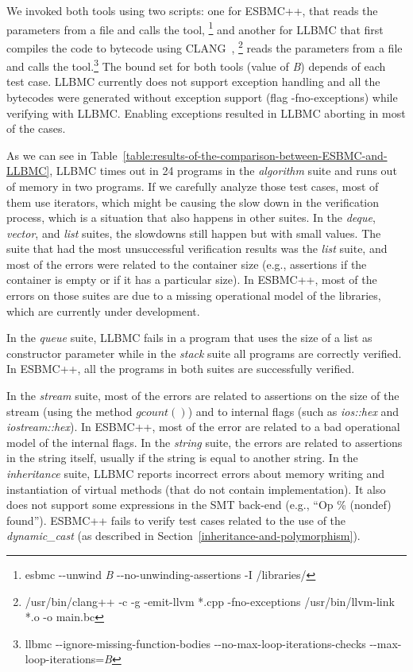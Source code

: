 \documentclass[conference]{IEEEtran}
\begin{document}
We invoked both tools using two scripts: one for ESBMC++, that reads
the parameters from a file and calls the tool,%
\footnote[1]{esbmc -\/-unwind \textit{B}  -\/-no-unwinding-assertions -I /libraries/}
and another for LLBMC that first compiles the code to bytecode using CLANG~\cite{CLANG},%
\footnote[2]{/usr/bin/clang++ -c -g -emit-llvm *.cpp -fno-exceptions \newline /usr/bin/llvm-link *.o -o main.bc}
reads the parameters from a file and calls the tool.\footnote[3]
{llbmc -\/-ignore-missing-function-bodies \newline -\/-no-max-loop-iterations-checks -\/-max-loop-iterations=\textit{B}}
The bound set for both tools (value of \textit{B}) depends of each test case.
LLBMC currently does not support exception handling and all the bytecodes were generated without
exception support (flag -fno-exceptions) while verifying with LLBMC.
Enabling exceptions resulted in LLBMC aborting in most of the cases.

As we can see in Table~\ref{table:results-of-the-comparison-between-ESBMC-and-LLBMC},
LLBMC times out in 24 programs in the \textit{algorithm} suite and
runs out of memory in two programs. If we carefully analyze those test cases,
most of them use iterators, which might be causing the slow down
in the verification process, which is a situation that also happens in other suites.
In the \textit{deque}, \textit{vector}, and \textit{list} suites,
the slowdowns still happen but with small values. The suite that had the
most unsuccessful verification results was the \textit{list} suite, and most of the
errors were related to the container size (e.g., assertions if the container
is empty or if it has a particular size). In ESBMC++, most of the errors on
those suites are due to a missing operational model
of the libraries, which are currently under development.

In the \textit{queue} suite, LLBMC fails in a program that uses the size of a list
as constructor parameter while in the \textit{stack} suite all programs are correctly verified.
In ESBMC++, all the programs in both suites are successfully verified.

In the \textit{stream} suite, most of the errors are related to assertions on the size
of the stream (using the method $gcount\left(\right)$) and to internal flags (such as
\textit{ios::hex} and \textit{iostream::hex}). In ESBMC++, most of the error are related
to a bad operational model of the internal flags. In the \textit{string} suite, the errors are related
to assertions in the string itself, usually if the string is equal to another string.
In the \textit{inheritance} suite, LLBMC reports incorrect errors about memory writing and
instantiation of virtual methods (that do not contain implementation).
It also does not support some expressions in the SMT back-end (e.g.,
``Op \% (nondef) found''). ESBMC++ fails to verify test cases related to the use of the
\textit{dynamic\_cast} (as described in Section~\ref{inheritance-and-polymorphism}).
\end{document}
